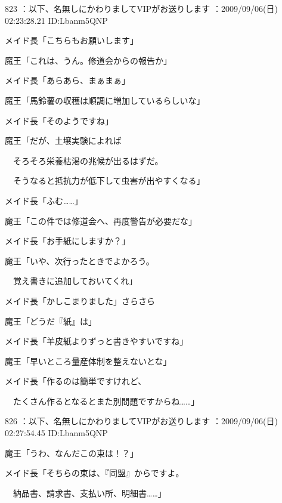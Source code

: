 \documentclass[a4j,twocolumn]{tarticle}
\begin{document}
	
    
    

823 ：以下、名無しにかわりましてVIPがお送りします ：2009/09/06(日) 02:23:28.21 ID:Lbanm5QNP 


メイド長「こちらもお願いします」\par{} 
魔王「これは、うん。修道会からの報告か」 



メイド長「あらあら、まぁまぁ」\par{} 
魔王「馬鈴薯の収穫は順調に増加しているらしいな」\par{} 
メイド長「そのようですね」 



魔王「だが、土壌実験によれば\par{} 
　そろそろ栄養枯渇の兆候が出るはずだ。\par{} 
　そうなると抵抗力が低下して虫害が出やすくなる」\par{} 
メイド長「ふむ……」 



魔王「この件では修道会へ、再度警告が必要だな」\par{} 
メイド長「お手紙にしますか？」 



魔王「いや、次行ったときでよかろう。\par{} 
　覚え書きに追加しておいてくれ」 



メイド長「かしこまりました」さらさら 



魔王「どうだ『紙』は」\par{} 
メイド長「羊皮紙よりずっと書きやすいですね」 



魔王「早いところ量産体制を整えないとな」\par{} 
メイド長「作るのは簡単ですけれど、\par{} 
　たくさん作るとなるとまた別問題ですからね……」 

	
    
    

826 ：以下、名無しにかわりましてVIPがお送りします ：2009/09/06(日) 02:27:54.45 ID:Lbanm5QNP


魔王「うわ、なんだこの束は！？」 



メイド長「そちらの束は、『同盟』からですよ。\par{} 
　納品書、請求書、支払い所、明細書……」 
\end{document}

